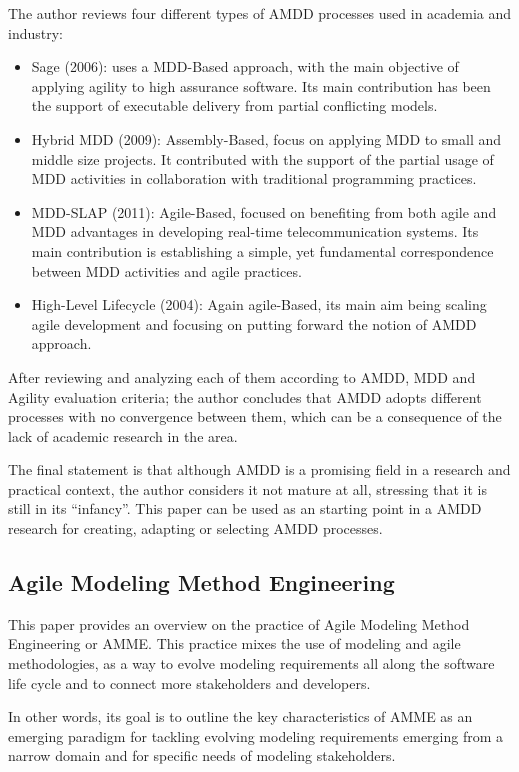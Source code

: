 \documentclass[10pt, a4paper, twocolumn]{article}
\begin{document}
The author reviews four different types of AMDD processes used in academia and industry:
\begin{itemize}
\item Sage (2006): uses a MDD-Based approach, with the main objective of applying agility to high assurance software. Its main contribution has been the support of executable delivery from partial conflicting models.
\item Hybrid MDD (2009): Assembly-Based, focus on applying MDD to small and middle size projects. It contributed with the support of the partial usage of MDD activities in collaboration with traditional programming practices.
\item MDD-SLAP (2011): Agile-Based, focused on benefiting from both agile and MDD advantages in developing real-time telecommunication systems. Its main contribution is establishing a simple, yet fundamental correspondence between MDD activities and agile practices.
\item High-Level Lifecycle (2004): Again agile-Based, its main aim being scaling agile development and focusing on putting forward the notion of AMDD approach.
\end{itemize}

After reviewing and analyzing each of them according to AMDD, MDD and Agility evaluation criteria; the author concludes that AMDD adopts different processes with no convergence between them, which can be a consequence of the lack of academic research in the area.

The final statement is that although AMDD is a promising field in a research and practical context, the author considers it not mature at all, stressing that it is still in its “infancy”. This paper can be used as an starting point in a AMDD research for creating, adapting or selecting AMDD processes.

\subsection{Agile Modeling Method Engineering}

This paper \cite{4} provides an overview on the practice of Agile Modeling Method Engineering or AMME. This practice mixes the use of modeling and agile methodologies, as a way to evolve modeling requirements all along the software life cycle and to connect more stakeholders and developers.

In other words, its goal is to outline the key characteristics of AMME as an emerging paradigm for tackling evolving modeling requirements emerging from a narrow domain and for specific
needs of modeling stakeholders.
\end{document}
